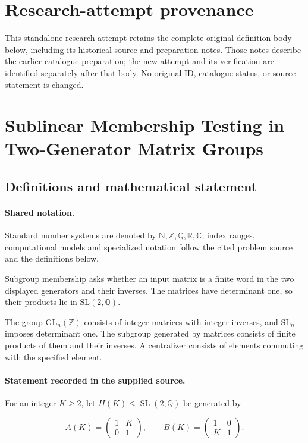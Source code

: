 \documentclass[11pt]{article}
\begin{document}
\section*{Research-attempt provenance}
This standalone research attempt retains the complete original definition body below,
including its historical source and preparation notes. Those notes describe the
earlier catalogue preparation; the new attempt and its verification are identified
separately after that body. No original ID, catalogue status, or source statement is changed.

\section{Sublinear Membership Testing in Two-Generator Matrix Groups}\label{statement}

\subsection{Definitions and mathematical statement}

\paragraph{Shared notation.}Standard number systems are denoted by $\mathbb N,\mathbb Z,\mathbb Q,\mathbb R,\mathbb C$; index ranges, computational models and specialized notation follow the cited problem source and the definitions below.


Subgroup membership asks whether an input matrix is a finite word in the two displayed generators and their inverses. The matrices have determinant one, so their products lie in $\mathrm{SL}(2,\mathbb Q)$.

The group $\mathrm{GL}_n(\mathbb Z)$ consists of integer matrices with integer inverses, and $\mathrm{SL}_n$ imposes determinant one. The subgroup generated by matrices consists of finite products of them and their inverses. A centralizer consists of elements commuting with the specified element.
\paragraph{Statement recorded in the supplied source.}
For an integer $K\geq2$, let $H(K)\leq\operatorname{SL}(2,\mathbb Q)$ be generated by

$$A(K)=\begin{pmatrix}1&K\\0&1\end{pmatrix},\qquad B(K)=\begin{pmatrix}1&0\\K&1\end{pmatrix}.$$
\end{document}
